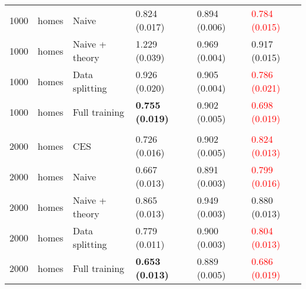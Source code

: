 \begin{tabular}[t]{rlllll}
\hspace{1em}1000 & homes & Naive & 0.824 (0.017) & 0.894 (0.006) & \textcolor{red}{0.784 (0.015)}\\
\hspace{1em}1000 & homes & Naive + theory & 1.229 (0.039) & 0.969 (0.004) & 0.917 (0.015)\\
\hspace{1em}1000 & homes & Data splitting & 0.926 (0.020) & 0.905 (0.004) & \textcolor{red}{0.786 (0.021)}\\
\hspace{1em}1000 & homes & Full training & \textbf{0.755 (0.019)} & 0.902 (0.005) & \textcolor{red}{0.698 (0.019)}\\
\addlinespace[0.3em]
\multicolumn{6}{l}{\textbf{2000}}\\
\hspace{1em}2000 & homes & CES & 0.726 (0.016) & 0.902 (0.005) & \textcolor{red}{0.824 (0.013)}\\
\hspace{1em}2000 & homes & Naive & 0.667 (0.013) & 0.891 (0.003) & \textcolor{red}{0.799 (0.016)}\\
\hspace{1em}2000 & homes & Naive + theory & 0.865 (0.013) & 0.949 (0.003) & 0.880 (0.013)\\
\hspace{1em}2000 & homes & Data splitting & 0.779 (0.011) & 0.900 (0.003) & \textcolor{red}{0.804 (0.013)}\\
\hspace{1em}2000 & homes & Full training & \textbf{0.653 (0.013)} & 0.889 (0.005) & \textcolor{red}{0.686 (0.019)}\\
\bottomrule
\end{tabular}

